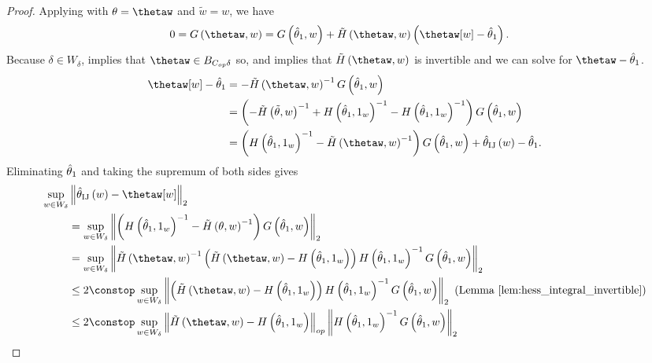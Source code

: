 %
\begin{proof}
%
Applying  with $\theta = \thetaw$ and
$\tilde{w} = w$, we have
%
\begin{align*}
0=G\left(\thetaw,w\right) & =
    G\left(\thetaone, w\right)
    +\hint\left(\thetaw, w\right) \left(\thetaw[w] - \thetaone\right).
\end{align*}
%
Because $\delta\in W_{\delta}$,  implies that
$\thetaw\in\thetadeltaball$ so, 
and  implies that
$\hint\left(\thetaw,w\right)$ is invertible and we can solve for
$\thetaw-\thetaone$.
%
\begin{align*}
\thetaw[w]-\thetaone & =
    -\hint\left(\thetaw, w\right)^{-1}G\left(\thetaone,w\right)\\
 & =\left(-\hint\left(\thetawiggle,w\right)^{-1} +
          H\left(\thetaone,\onevec\right)^{-1} -
          H\left(\thetaone,\onevec\right)^{-1}\right)
            G\left(\thetaone,w\right)\\
 & =\left(H\left(\thetaone,\onevec\right)^{-1} -
          \hint\left(\thetaw,w\right)^{-1}\right) G\left(\thetaone,w\right)+
    \thetaij\left(w\right)-\thetaone.
\end{align*}
%
Eliminating $\hat{\theta}_{1}$ and taking the supremum of both sides gives
%
\begin{align*}
\sup_{w\in W_{\delta}} &
    \norm{\thetaij\left(w\right)-{{\thetaw[w]}}}_{2}\\
 & =\sup_{w\in W_{\delta}}\norm{
    \left(H\left(\thetaone,\onevec\right)^{-1} -
          \hint\left(\theta, w\right)^{-1}\right)
            G\left(\thetaone,w\right)}_{2}\\
 & =\sup_{w\in W_{\delta}}\norm{
    \hint\left(\thetaw, w\right)^{-1}\left(
        \hint\left(\thetaw,w\right) -
        H\left(\thetaone,\onevec\right)\right)
            H\left(\thetaone,\onevec\right)^{-1}
                G\left(\thetaone,w\right)}_{2}\\
 & \le2\constop\sup_{w\in W_{\delta}}\norm{
    \left(\hint\left(\thetaw,w\right) -
          H\left(\thetaone,\onevec\right)\right)
            H\left(\thetaone,\onevec\right)^{-1}
                G\left(\thetaone,w\right)}_{2}\textrm{ (Lemma
                    \ref{lem:hess_integral_invertible})}\\
 & \le2\constop\sup_{w\in W_{\delta}}\norm{
    \hint\left(\thetaw,w\right) -
    H\left(\thetaone,\onevec\right)}_{op}
    \norm{H\left(\thetaone,\onevec\right)^{-1}G\left(\thetaone,w\right)}_{2}\\

\end{align*}
\end{proof}
